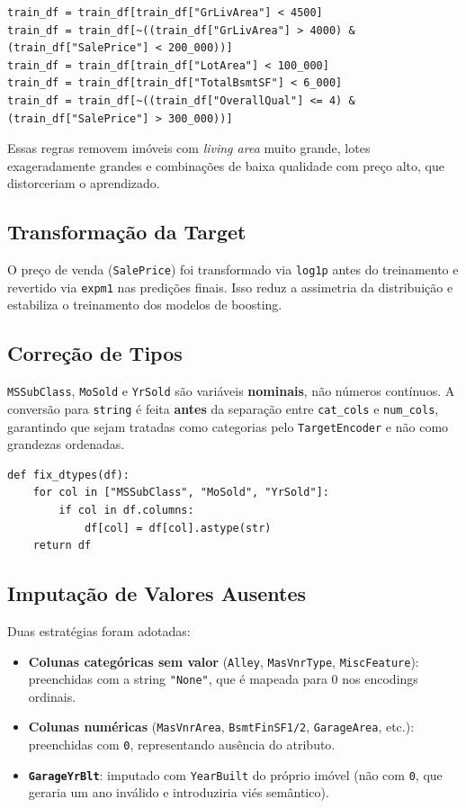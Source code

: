 \documentclass[12pt,a4paper]{article}
\begin{document}
\begin{verbatim}
train_df = train_df[train_df["GrLivArea"] < 4500]
train_df = train_df[~((train_df["GrLivArea"] > 4000) & (train_df["SalePrice"] < 200_000))]
train_df = train_df[train_df["LotArea"] < 100_000]
train_df = train_df[train_df["TotalBsmtSF"] < 6_000]
train_df = train_df[~((train_df["OverallQual"] <= 4) & (train_df["SalePrice"] > 300_000))]
\end{verbatim}

Essas regras removem imóveis com \emph{living area} muito grande, lotes
exageradamente grandes e combinações de baixa qualidade com preço alto, que
distorceriam o aprendizado.
\subsection{Transformação da Target}
\label{sec:orgdc91d38}

O preço de venda (\texttt{SalePrice}) foi transformado via \texttt{log1p} antes do
treinamento e revertido via \texttt{expm1} nas predições finais. Isso reduz a
assimetria da distribuição e estabiliza o treinamento dos modelos de boosting.
\subsection{Correção de Tipos}
\label{sec:org1667ff4}

\texttt{MSSubClass}, \texttt{MoSold} e \texttt{YrSold} são variáveis \textbf{nominais}, não números
contínuos. A conversão para \texttt{string} é feita \textbf{antes} da separação entre
\texttt{cat\_cols} e \texttt{num\_cols}, garantindo que sejam tratadas como categorias pelo
\texttt{TargetEncoder} e não como grandezas ordenadas.

\begin{verbatim}
def fix_dtypes(df):
    for col in ["MSSubClass", "MoSold", "YrSold"]:
        if col in df.columns:
            df[col] = df[col].astype(str)
    return df
\end{verbatim}
\subsection{Imputação de Valores Ausentes}
\label{sec:org40d6b3c}

Duas estratégias foram adotadas:

\begin{itemize}
\item \textbf{Colunas categóricas sem valor} (\texttt{Alley}, \texttt{MasVnrType}, \texttt{MiscFeature}):
preenchidas com a string \texttt{"None"}, que é mapeada para 0 nos encodings
ordinais.

\item \textbf{Colunas numéricas} (\texttt{MasVnrArea}, \texttt{BsmtFinSF1/2}, \texttt{GarageArea}, etc.):
preenchidas com \texttt{0}, representando ausência do atributo.

\item \textbf{\texttt{GarageYrBlt}}: imputado com \texttt{YearBuilt} do próprio imóvel (não com \texttt{0},
que geraria um ano inválido e introduziria viés semântico).
\end{itemize}
\end{document}
